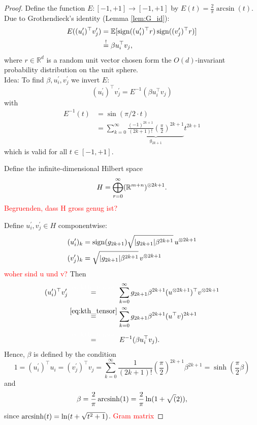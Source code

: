 \begin{proof}
	Define the function $E: [-1,+1] \to [-1,+1]$ by $E(t)=\frac{2}{\pi}\arcsin(t)$. Due to Grothendieck's identity (Lemma \ref{lem:G_id}):
	\begin{align*}
		E((u_i^\prime)^\top v_j^\prime ) &= \mathbb{E}[\operatorname{sign}((u_i^\prime)^\top r)\operatorname{sign}((v_j^\prime)^\top r)]\\
		&\overset{!}{=}\beta u_i^\top v_j,
	\end{align*}
	where $r\in\mathbb{R}^d$ is a random unit vector chosen form the $O(d)$-invariant probability distribution on the unit sphere.\\
	
	Idea: To find $\beta,u_i^\prime,v_j^\prime$ we invert $E$:
	\[
		(u_i^\prime)^\top v_j^\prime = E^{-1} (\beta u_i^\top v_j)	
	\]
	with 
	\begin{align*}
		E^{-1}(t) &= \sin(\pi/2 \cdot t) \\
		&= \sum_{k=0}^\infty \underbrace{\frac{(-1)^{2k+1}}{(2k+1)!}\left(\frac{\pi}{2}\right)^{2k+1}}_{g_{2k+1}}  t^{2k+1}
	\end{align*}
	which is valid for all $t\in[-1,+1]$.
	
	Define the infinite-dimensional Hilbert space
	\begin{equation}
		H= \bigoplus_{r=0}^\infty (\mathbb{R}^{m+n})^{\otimes 2k+1}.
	\end{equation}
	\textcolor{red}{Begruenden, dass H gross genug ist?}
	
	Define $u_i^\prime, v_j^\prime\in H$ componentwise:
	\begin{align*}
		(u_i^\prime)_k &= \operatorname{sign}(g_{2k+1}) \sqrt{{\left|{g_{2k+1}}\right|}\beta^{2k+1}}\, u^{\otimes 2k+1} \\
		(v_j^\prime)_k &= \sqrt{{\left|{g_{2k+1}}\right|}\beta^{2k+1}} \,v^{\otimes 2k+1}
	\end{align*}
	\textcolor{red}{woher sind u und v?}
	Then 
	\begin{align*}
		(u_i^\prime)^\top v_j^\prime &\overset{\textcolor{white}{\eqref*{eq:kth_tensor}}}{=} \sum_{k=0}^\infty g_{2k+1} \beta^{2k+1}(u^{\tensor 2k+1})^\top v^{\tensor 2k+1} \\
		&\overset{\eqref{eq:kth_tensor}}{=} \sum_{k=0}^\infty g_{2k+1} \beta^{2k+1} (u^\top v)^{2k+1} \\
		&\overset{\textcolor{white}{\eqref*{eq:kth_tensor}}}{=} E^{-1}(\beta u_i^\top v_j).
	\end{align*}
	Hence, $\beta$ is defined by the condition
	\[
		1 = (u_i^\prime)^\top u_i = (v_j^\prime)^\top v_j 
		= \sum_{k=0}^\infty \frac{1}{(2k+1)!}\left(\frac{\pi}{2}\right)^{2k+1}\beta^{2k+1}=\sinh(\frac{\pi}{2}\beta)
	\]
	and
	\[
		\beta = \frac{2}{\pi} \operatorname{arcsinh}(1) = \frac{2}{\pi}\ln(1+\sqrt(2)),	
	\]
	since $\operatorname{arcsinh} (t) = \ln(t+\sqrt{t^2+1})$.
	\textcolor{red}{Gram matrix}
\end{proof}
